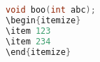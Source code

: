 
\begin{lstlisting}[language=cpp]
void boo(int abc);
\begin{itemize}
\item 123
\item 234
\end{itemize}
\end{lstlisting}
